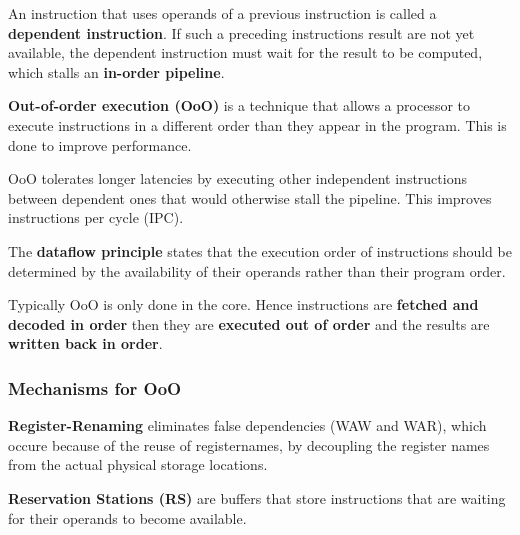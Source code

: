 \begin{remark}
	An instruction that uses operands of a previous instruction is called a \textbf{dependent instruction}. If such a preceding instructions result are not yet available, the dependent instruction must wait for the result to be computed, which stalls an \textbf{in-order pipeline}.
\end{remark}

\begin{definition}
	\textbf{Out-of-order execution (OoO)} is a technique that allows a processor to execute instructions in a different order than they appear in the program. This is done to improve performance.
\end{definition}

\begin{remark}
	OoO tolerates longer latencies by executing other independent instructions between dependent ones that would otherwise stall the pipeline. This improves instructions per cycle (IPC).
\end{remark}

\begin{definition}
	The \textbf{dataflow principle} states that the execution order of instructions should be determined by the availability of their operands rather than their program order.
\end{definition}

\begin{remark}
	Typically OoO is only done in the core. Hence instructions are \textbf{fetched and decoded in order} then they are \textbf{executed out of order} and the results are \textbf{written back in order}.
\end{remark}

\subsubsection{Mechanisms for OoO}

\begin{definition}
	\textbf{Register-Renaming} eliminates false dependencies (WAW and WAR), which occure because of the reuse of registernames, by decoupling the register names from the actual physical storage locations.
\end{definition}

\begin{definition}
	\textbf{Reservation Stations (RS)} are buffers that store instructions that are waiting for their operands to become available.
\end{definition}

